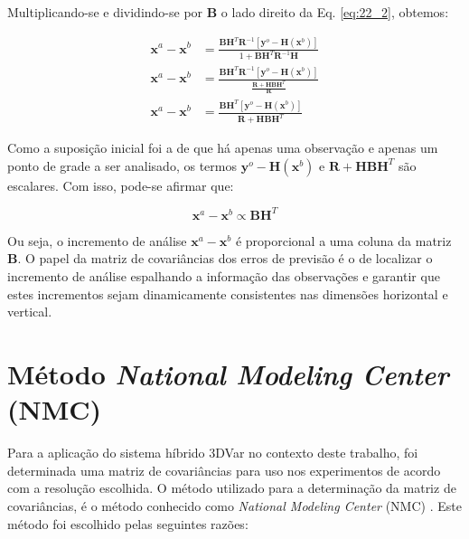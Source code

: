 Multiplicando-se e dividindo-se por $\mathbf{B}$ o lado direito da Eq. \ref{eq:22_2}, obtemos:

\begin{align}
    \label{eq:22_3}
    \mathbf{x}^{a} - \mathbf{x}^{b} & = \frac{\mathbf{B}\mathbf{H}^{T}\mathbf{R}^{-1}[\mathbf{y}^{o} - \mathbf{H}(\mathbf{x}^{b})]}{1 + \mathbf{B}\mathbf{H}^{T}\mathbf{R}^{-1}\mathbf{H}} \\
    \label{eq:22_4}
    \mathbf{x}^{a} - \mathbf{x}^{b} & = \frac{\mathbf{B}\mathbf{H}^{T}\mathbf{R}^{-1}[\mathbf{y}^{o} - \mathbf{H}(\mathbf{x}^{b})]}{\frac{\mathbf{R} + \mathbf{H}\mathbf{B}\mathbf{H}^{T}}{\mathbf{R}}} \\
    \label{eq:22_5}
    \mathbf{x}^{a} - \mathbf{x}^{b} & = \frac{\mathbf{B}\mathbf{H}^{T}[\mathbf{y}^{o} - \mathbf{H}(\mathbf{x}^{b})]}{\mathbf{R} + \mathbf{H}\mathbf{B}\mathbf{H}^{T}}
\end{align}

Como a suposição inicial foi a de que há apenas uma observação e apenas um ponto de grade a ser analisado,  os termos $\mathbf{y}^{o} - \mathbf{H}(\mathbf{x}^{b})$ e $\mathbf{R} + \mathbf{H}\mathbf{B}\mathbf{H}^{T}$ são escalares. Com isso, pode-se afirmar que:

\begin{equation}
\label{eq:24}
\mathbf{x}^{a}-\mathbf{x}^{b} \propto \mathbf{BH}^{T}
\end{equation}

Ou seja, o incremento de análise $\mathbf{x}^{a}-\mathbf{x}^{b}$ é proporcional a uma coluna da matriz $\mathbf{B}$. O papel da matriz de covariâncias dos erros de previsão é o de localizar o incremento de análise espalhando a informação das observações e garantir que estes incrementos sejam dinamicamente consistentes nas dimensões horizontal e vertical.

\section{Método \textit{National Modeling Center} (NMC)}
\label{sec:met_NMC}

Para a aplicação do sistema híbrido 3DVar no contexto deste trabalho, foi determinada uma matriz de covariâncias para uso nos experimentos de acordo com a resolução escolhida. O método utilizado para a determinação da matriz de covariâncias, é o método conhecido como \textit{National Modeling Center} (NMC) \cite{parrishederber/1992}. Este método foi escolhido pelas seguintes razões:

